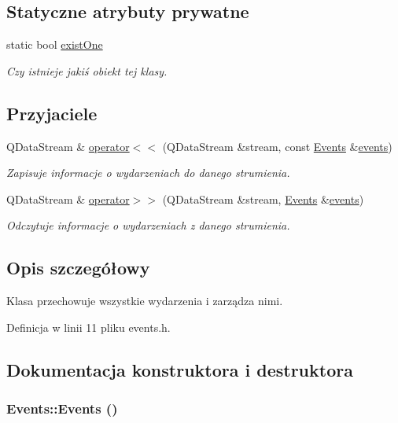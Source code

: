 \subsection*{Statyczne atrybuty prywatne}
\begin{DoxyCompactItemize}
\item 
static bool \hyperlink{classEvents_a5b2f7b7d038ce9447080499b0736c4fe}{existOne}
\begin{DoxyCompactList}\small\item\em Czy istnieje jakiś obiekt tej klasy. \item\end{DoxyCompactList}\end{DoxyCompactItemize}
\subsection*{Przyjaciele}
\begin{DoxyCompactItemize}
\item 
QDataStream \& \hyperlink{classEvents_a560f3fdc9b76a9fe9146335122ecda39}{operator$<$$<$} (QDataStream \&stream, const \hyperlink{classEvents}{Events} \&\hyperlink{classEvents_a38bc398f90e69e671e7411bf73cf3fc0}{events})
\begin{DoxyCompactList}\small\item\em Zapisuje informacje o wydarzeniach do danego strumienia. \item\end{DoxyCompactList}\item 
QDataStream \& \hyperlink{classEvents_a9e3a2b909c5dcbc9519365ccafc4a96f}{operator$>$$>$} (QDataStream \&stream, \hyperlink{classEvents}{Events} \&\hyperlink{classEvents_a38bc398f90e69e671e7411bf73cf3fc0}{events})
\begin{DoxyCompactList}\small\item\em Odczytuje informacje o wydarzeniach z danego strumienia. \item\end{DoxyCompactList}\end{DoxyCompactItemize}


\subsection{Opis szczegółowy}
Klasa przechowuje wszystkie wydarzenia i zarządza nimi. 

Definicja w linii 11 pliku events.h.



\subsection{Dokumentacja konstruktora i destruktora}
\hypertarget{classEvents_aab651428bab6b09db3564753afb225a6}{
\subsubsection[{Events}]{\setlength{\rightskip}{0pt plus 5cm}Events::Events ()}}
\label{classEvents_aab651428bab6b09db3564753afb225a6}



